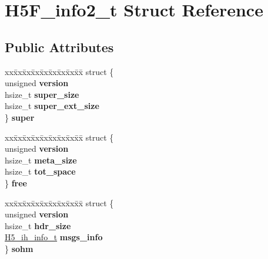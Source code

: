 \hypertarget{struct_h5_f__info2__t}{}\section{H5\+F\+\_\+info2\+\_\+t Struct Reference}
\label{struct_h5_f__info2__t}
\subsection*{Public Attributes}
\begin{DoxyCompactItemize}
\item 
\mbox{\label{struct_h5_f__info2__t_a42270bc2bbd762c6ad209eff9660e969}} 
\begin{tabbing}
xx\=xx\=xx\=xx\=xx\=xx\=xx\=xx\=xx\=\kill
struct \{\\
\>unsigned {\bfseries version}\\
\>hsize\_t {\bfseries super\_size}\\
\>hsize\_t {\bfseries super\_ext\_size}\\
\} {\bfseries super}\\

\end{tabbing}\item 
\mbox{\label{struct_h5_f__info2__t_a3c3f05e180e887e07e6f2f1514d70800}} 
\begin{tabbing}
xx\=xx\=xx\=xx\=xx\=xx\=xx\=xx\=xx\=\kill
struct \{\\
\>unsigned {\bfseries version}\\
\>hsize\_t {\bfseries meta\_size}\\
\>hsize\_t {\bfseries tot\_space}\\
\} {\bfseries free}\\

\end{tabbing}\item 
\mbox{\label{struct_h5_f__info2__t_a875787243eb008a1be30fc05d203c514}} 
\begin{tabbing}
xx\=xx\=xx\=xx\=xx\=xx\=xx\=xx\=xx\=\kill
struct \{\\
\>unsigned {\bfseries version}\\
\>hsize\_t {\bfseries hdr\_size}\\
\>\hyperlink{struct_h5__ih__info__t}{H5\_ih\_info\_t} {\bfseries msgs\_info}\\
\} {\bfseries sohm}\\


\end{tabbing}
\end{DoxyCompactItemize}
